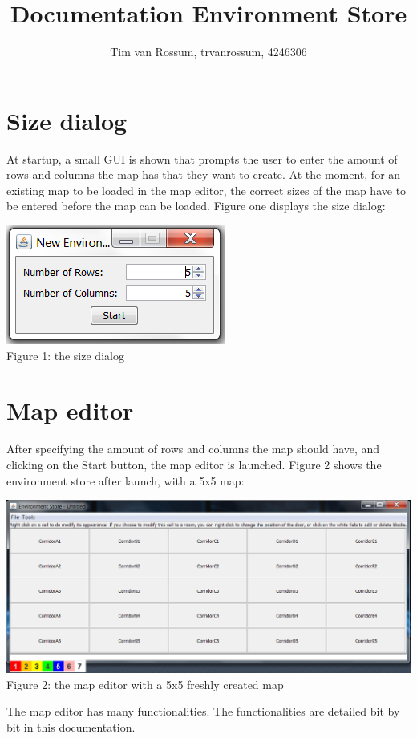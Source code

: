 \documentclass[]{article}
\title{Documentation Environment Store}
\author{Tim van Rossum, trvanrossum, 4246306}
\begin{document}
\maketitle

\section*{Size dialog}
At startup, a small GUI is shown that prompts the user to enter the amount of rows and columns the map has that they want to create. At the moment, for an existing map to be loaded in the map editor, the correct sizes of the map have to be entered before the map can be loaded. Figure one displays the size dialog:
\begin{center}
	\centering
	\includegraphics{SizeDialog.png}\\
	Figure 1: the size dialog
\end{center}
\section*{Map editor}
After specifying the amount of rows and columns the map should have, and clicking on the Start button, the map editor is launched. Figure 2 shows the environment store after launch, with a 5x5 map:
\begin{center}
	\centering
	\includegraphics[scale=0.55]{MapEditor.png}\\
	Figure 2: the map editor with a 5x5 freshly created map
\end{center}
The map editor has many functionalities. The functionalities are detailed bit by bit in this documentation.
\end{document}
